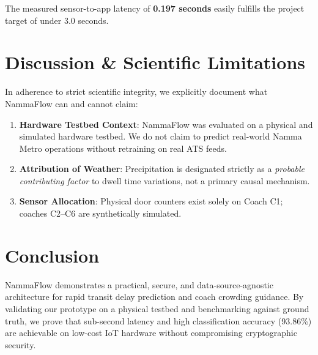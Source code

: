 \documentclass[conference]{IEEEtran}
\begin{document}
The measured sensor-to-app latency of \textbf{0.197 seconds} easily fulfills the project target of under 3.0 seconds.

\section{Discussion \& Scientific Limitations}
In adherence to strict scientific integrity, we explicitly document what NammaFlow can and cannot claim:
\begin{enumerate}
    \item \textbf{Hardware Testbed Context}: NammaFlow was evaluated on a physical and simulated hardware testbed. We do not claim to predict real-world Namma Metro operations without retraining on real ATS feeds.
    \item \textbf{Attribution of Weather}: Precipitation is designated strictly as a \textit{probable contributing factor} to dwell time variations, not a primary causal mechanism.
    \item \textbf{Sensor Allocation}: Physical door counters exist solely on Coach C1; coaches C2--C6 are synthetically simulated.
\end{enumerate}

\section{Conclusion}
NammaFlow demonstrates a practical, secure, and data-source-agnostic architecture for rapid transit delay prediction and coach crowding guidance. By validating our prototype on a physical testbed and benchmarking against ground truth, we prove that sub-second latency and high classification accuracy (93.86\%) are achievable on low-cost IoT hardware without compromising cryptographic security.



\end{document}
